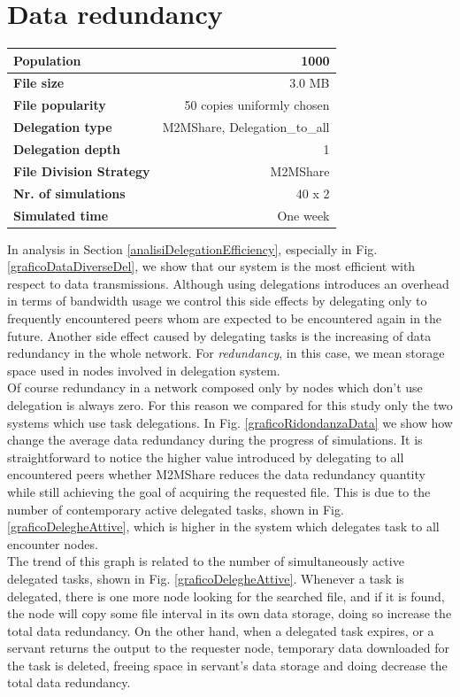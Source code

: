 \newpage
\section{Data redundancy}
\begin{table}[h]
\begin{center}
\begin{tabular}{|l|r|}
\hline
\bfseries Population & 1000 \\
\hline
\bfseries File size & 3.0 MB \\
\hline
\bfseries File popularity & 50 copies uniformly chosen \\
\hline
\bfseries Delegation type & M2MShare, Delegation\_to\_all \\
\hline
\bfseries Delegation depth & 1 \\
\hline
\bfseries File Division Strategy & M2MShare \\
\hline
\bfseries Nr. of simulations & 40 x 2\\
\hline
\bfseries Simulated time & One week \\
\hline
\end{tabular}
\end{center}
\end{table}

In analysis in Section \ref{analisiDelegationEfficiency}, especially in Fig.  \ref{graficoDataDiverseDel}, we show that our system is the most efficient with respect to data transmissions. Although using delegations introduces an overhead in terms of bandwidth usage we control this side effects by delegating only to frequently encountered peers whom are expected to be encountered again in the future. Another side effect caused by delegating tasks is the increasing of data redundancy in the whole network. For \textit{redundancy}, in this case, we mean storage space used in nodes involved in delegation system. 
\\ 

Of course redundancy in a network composed only by nodes which don't use delegation is always zero. For this reason we compared for this study only the two systems which use task delegations. In Fig. \ref{graficoRidondanzaData} we show how change the average data redundancy during the progress of simulations. It is straightforward to notice the higher value introduced by delegating to all encountered peers whether M2MShare reduces the data redundancy quantity while still achieving the goal of acquiring the requested file. This is due to the number of contemporary active delegated tasks, shown in Fig. \ref{graficoDelegheAttive}, which is higher in the system which delegates task to all encounter nodes. 
\\
The trend of this graph is related to the number of simultaneously active delegated tasks, shown in Fig. \ref{graficoDelegheAttive}. Whenever a task is delegated, there is one more node looking for the searched file, and if it is found, the node will copy some file interval in its own data storage, doing so increase the total data redundancy. On the other hand, when a delegated task expires, or a servant returns the output to the requester node, temporary data downloaded for the task is deleted, freeing space in servant's data storage and doing decrease the total data redundancy.

